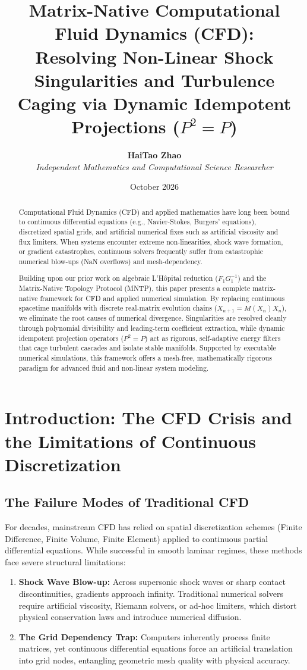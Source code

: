 \documentclass[11pt,a4paper]{article}
\title{\textbf{Matrix-Native Computational Fluid Dynamics (CFD):} \\ Resolving Non-Linear Shock Singularities and Turbulence Caging via Dynamic Idempotent Projections ($P^2 = P$)}
\author{\textbf{HaiTao Zhao} \\ \textit{Independent Mathematics and Computational Science Researcher}}
\date{October 2026}
\begin{document}
\maketitle

\begin{abstract}
Computational Fluid Dynamics (CFD) and applied mathematics have long been bound to continuous differential equations (e.g., Navier-Stokes, Burgers' equations), discretized spatial grids, and artificial numerical fixes such as artificial viscosity and flux limiters. When systems encounter extreme non-linearities, shock wave formation, or gradient catastrophes, continuous solvers frequently suffer from catastrophic numerical blow-ups (NaN overflows) and mesh-dependency. 

Building upon our prior work on algebraic L'Hôpital reduction ($F_1 G_1^{-1}$) and the Matrix-Native Topology Protocol (MNTP), this paper presents a complete matrix-native framework for CFD and applied numerical simulation. By replacing continuous spacetime manifolds with discrete real-matrix evolution chains ($X_{n+1} = M(X_n)X_n$), we eliminate the root causes of numerical divergence. Singularities are resolved cleanly through polynomial divisibility and leading-term coefficient extraction, while dynamic idempotent projection operators ($P^2 = P$) act as rigorous, self-adaptive energy filters that cage turbulent cascades and isolate stable manifolds. Supported by executable numerical simulations, this framework offers a mesh-free, mathematically rigorous paradigm for advanced fluid and non-linear system modeling.
\end{abstract}

\section{Introduction: The CFD Crisis and the Limitations of Continuous Discretization}

\subsection{The Failure Modes of Traditional CFD}
For decades, mainstream CFD has relied on spatial discretization schemes (Finite Difference, Finite Volume, Finite Element) applied to continuous partial differential equations. While successful in smooth laminar regimes, these methods face severe structural limitations:
\begin{enumerate}
    \item \textbf{Shock Wave Blow-up:} Across supersonic shock waves or sharp contact discontinuities, gradients approach infinity. Traditional numerical solvers require artificial viscosity, Riemann solvers, or ad-hoc limiters, which distort physical conservation laws and introduce numerical diffusion.
    \item \textbf{The Grid Dependency Trap:} Computers inherently process finite matrices, yet continuous differential equations force an artificial translation into grid nodes, entangling geometric mesh quality with physical accuracy.
\end{enumerate}
\end{document}
